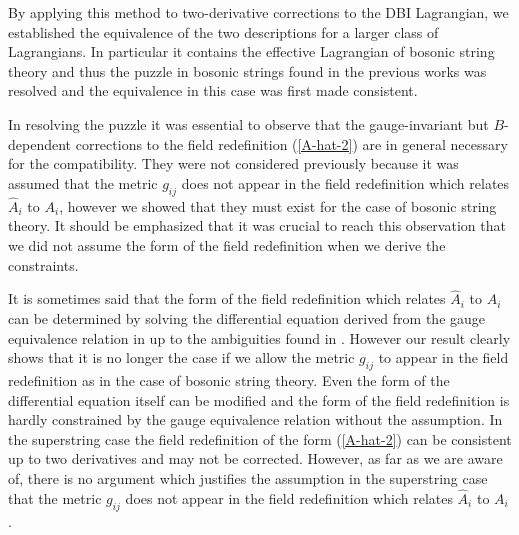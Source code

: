 \documentclass[a4paper,12pt]{article}
\begin{document}
By applying this method to two-derivative corrections
to the DBI Lagrangian,
we established the equivalence of the two descriptions
for a larger class of Lagrangians.
In particular it contains the effective Lagrangian of bosonic
string theory and thus
the puzzle in bosonic strings
found in the previous works was resolved
and the equivalence in this case was first made consistent.

In resolving the puzzle it was essential to observe
that the gauge-invariant but $B$-dependent corrections
to the field redefinition (\ref{A-hat-2})
are in general necessary for the compatibility.
They were not considered previously because it was assumed that
the metric $g_{ij}$ does not appear in the field redefinition
which relates $\hat{A}_i$ to $A_i$,
however we showed
that they must exist for the case of bosonic string theory.
It should be emphasized that
it was crucial to reach this observation that
we did not assume the form of the field redefinition
when we derive the constraints.

It is sometimes said that the form of the field redefinition
which relates $\hat{A}_i$ to $A_i$
can be determined by solving the differential equation
derived from the gauge equivalence relation
in \cite{SW} up to the ambiguities found in \cite{AK}.
However our result clearly shows that
it is no longer the case if we allow the metric $g_{ij}$
to appear in the field redefinition
as in the case of bosonic string theory.
Even the form of the differential equation itself can be modified
and the form of the field redefinition is hardly constrained
by the gauge equivalence relation without the assumption.
In the superstring case the field redefinition of the form
(\ref{A-hat-2}) can be consistent
up to two derivatives \cite{Terashima}
and may not be corrected.
However, as far as we are aware of,
there is no argument which justifies the assumption
in the superstring case
that the metric $g_{ij}$ does not appear in the field redefinition
which relates $\hat{A}_i$ to $A_i$.
\end{document}
